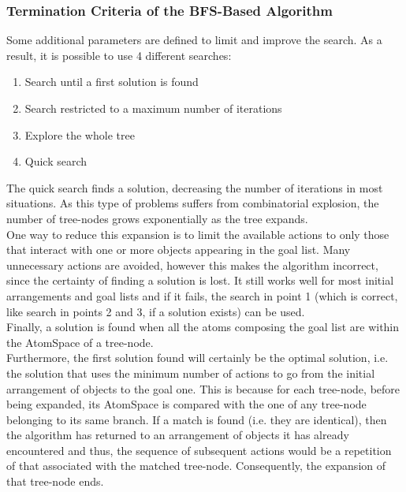 \subsubsection{Termination Criteria of the BFS-Based Algorithm}\label{sec:term_criteria}

Some additional parameters are defined to limit and improve the search. As a result, it is possible to use 4 different searches:

\begin{enumerate}
	\item Search until a first solution is found
	\item Search restricted to a maximum number of iterations 
	\item Explore the whole tree
	\item Quick search
\end{enumerate}

The quick search finds a solution, decreasing the number of iterations in most situations.
As this type of problems suffers from combinatorial explosion\footnotemark{}, the number of tree-nodes grows exponentially as the tree expands.
 \\
One way to reduce this expansion is to limit the available actions to only those that interact with one or more objects appearing in the goal list.
Many unnecessary actions are avoided, however this makes the algorithm incorrect, since the certainty of finding a solution is lost.
It still works well for most initial arrangements and goal lists and if it fails, the search in point 1 (which is correct, like search in points 2 and 3, if a solution exists) can be used. \\

Finally, a solution is found when all the atoms composing the goal list are within the AtomSpace of a tree-node. \\
Furthermore, the first solution found will certainly be the optimal solution, i.e. the solution that uses the minimum number of actions to go from the initial arrangement of objects to the goal one.
This is because for each tree-node, before being expanded, its AtomSpace is compared with the one of any tree-node belonging to its same branch.
If a match is found (i.e. they are identical), then the algorithm has returned to an arrangement of objects it has already encountered and thus, the sequence of subsequent actions would be a repetition of that associated with the matched tree-node. Consequently, the expansion of that tree-node ends.


